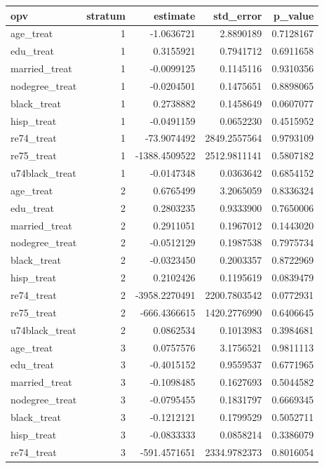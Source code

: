 \documentclass[
]{article}
\begin{document}
\begin{longtable}[]{@{}lrrrr@{}}
\toprule\noalign{}
opv & stratum & estimate & std\_error & p\_value \\
\midrule\noalign{}
\endhead
\bottomrule\noalign{}
\endlastfoot
age\_treat & 1 & -1.0636721 & 2.8890189 & 0.7128167 \\
edu\_treat & 1 & 0.3155921 & 0.7941712 & 0.6911658 \\
married\_treat & 1 & -0.0099125 & 0.1145116 & 0.9310356 \\
nodegree\_treat & 1 & -0.0204501 & 0.1475651 & 0.8898065 \\
black\_treat & 1 & 0.2738882 & 0.1458649 & 0.0607077 \\
hisp\_treat & 1 & -0.0491159 & 0.0652230 & 0.4515952 \\
re74\_treat & 1 & -73.9074492 & 2849.2557564 & 0.9793109 \\
re75\_treat & 1 & -1388.4509522 & 2512.9811141 & 0.5807182 \\
u74black\_treat & 1 & -0.0147348 & 0.0363642 & 0.6854152 \\
age\_treat & 2 & 0.6765499 & 3.2065059 & 0.8336324 \\
edu\_treat & 2 & 0.2803235 & 0.9333900 & 0.7650006 \\
married\_treat & 2 & 0.2911051 & 0.1967012 & 0.1443020 \\
nodegree\_treat & 2 & -0.0512129 & 0.1987538 & 0.7975734 \\
black\_treat & 2 & -0.0323450 & 0.2003357 & 0.8722969 \\
hisp\_treat & 2 & 0.2102426 & 0.1195619 & 0.0839479 \\
re74\_treat & 2 & -3958.2270491 & 2200.7803542 & 0.0772931 \\
re75\_treat & 2 & -666.4366615 & 1420.2776990 & 0.6406645 \\
u74black\_treat & 2 & 0.0862534 & 0.1013983 & 0.3984681 \\
age\_treat & 3 & 0.0757576 & 3.1756521 & 0.9811113 \\
edu\_treat & 3 & -0.4015152 & 0.9559537 & 0.6771965 \\
married\_treat & 3 & -0.1098485 & 0.1627693 & 0.5044582 \\
nodegree\_treat & 3 & -0.0795455 & 0.1831797 & 0.6669345 \\
black\_treat & 3 & -0.1212121 & 0.1799529 & 0.5052711 \\
hisp\_treat & 3 & -0.0833333 & 0.0858214 & 0.3386079 \\
re74\_treat & 3 & -591.4571651 & 2334.9782373 & 0.8016054 \\

\end{longtable}
\end{document}
